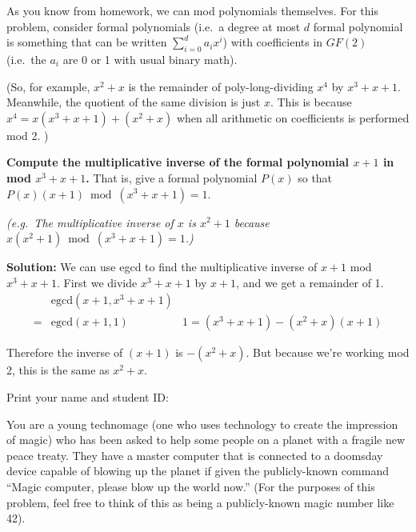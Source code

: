 \documentclass[11pt,fleqn]{article}
\newcommand{\fillin}[1]{\underline{\hskip #1}}
\newcommand{\startnewpage}{\newpage \noindent \vspace{0mm} {\sc Print} your name and student ID: \fillin{5in}\\[-0.2in]}
\renewcommand{\answer}[1]{{\color{mydarkblue}\textbf{Solution: }#1}}
\begin{document}
\begin{qunlist}


As you know from homework, we can mod polynomials themselves. For this
problem, consider formal polynomials (i.e.~a degree at most $d$ formal
polynomial is something that can be written $\sum_{i=0}^{d} a_i x^i$)
with coefficients in $GF(2)$ (i.e.~the $a_i$ are 0 or 1 with usual binary
math). 

(So, for example, $x^2 + x$ is the remainder of
poly-long-dividing $x^4$ by $x^3 + x + 1$. Meanwhile, the quotient of
the same division is just $x$. This is because $x^4 = x(x^3 + x + 1) +
(x^2 + x)$ when all arithmetic on coefficients is performed mod 2. )

{\bf Compute the multiplicative inverse of the formal polynomial $x+1$ in mod $x^3
+ x + 1$.} That is, give a formal polynomial $P(x)$ so that $P(x)(x+1)
\bmod (x^3 + x + 1) = 1$. 

{\em (e.g.~The multiplicative inverse of $x$ is $x^2 + 1$ because
  $x(x^2 + 1) \bmod (x^3 + x + 1) = 1$.)}

\answer{
We can use egcd to find the multiplicative inverse of $x+1$ mod $x^3+x+1$.  First we divide $x^3+x+1$ by $x+1$, and we get a remainder of 1.
\begin{align*}
& \text{egcd}(x+1,x^3+x+1) \\
= & \text{egcd}(x+1,1) & 1 = (x^3+x+1) - (x^2+x)(x+1) 
\end{align*}

Therefore the inverse of $(x+1)$ is $-(x^2+x)$. But because we're working mod 2, this is the same as $\boxed{x^2+x}$.
}



\startnewpage


You are a young technomage (one who uses technology to create the
impression of magic) who has been asked to help some people on a
planet with a fragile new peace treaty. They have a master computer that
is connected to a doomsday device capable of blowing up the planet if
given the publicly-known command ``Magic computer, please blow up the
world now.'' (For the purposes of this problem, feel free to think of
this as being a publicly-known magic number like 42). 


\end{qunlist}
\end{document}
